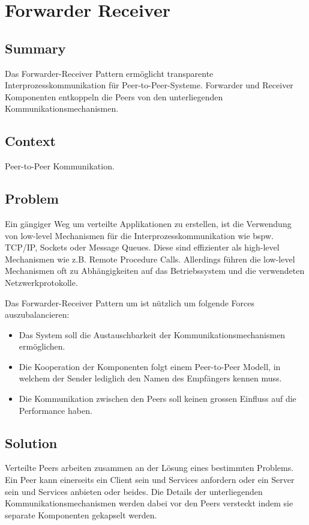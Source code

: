 \chapter{Forwarder Receiver}
\section{Summary}
Das Forwarder-Receiver Pattern ermöglicht transparente Interprozesskommunikation für Peer-to-Peer-Systeme. Forwarder und Receiver Komponenten entkoppeln die Peers von den unterliegenden Kommunikationsmechanismen.

\section{Context}
Peer-to-Peer Kommunikation.

\section{Problem}
Ein gängiger Weg um verteilte Applikationen zu erstellen, ist die Verwendung von low-level Mechanismen für die Interprozesskommunikation wie bspw. TCP/IP, Sockets oder Message Queues. Diese sind effizienter als high-level Mechanismen wie z.B. Remote Procedure Calls. Allerdings führen die low-level Mechanismen oft zu Abhängigkeiten auf das Betriebssystem und die verwendeten Netzwerkprotokolle.

Das Forwarder-Receiver Pattern um ist nützlich um folgende Forces auszubalancieren:
\begin{itemize}
	\item Das System soll die Austauschbarkeit der Kommunikationsmechanismen ermöglichen.
	\item Die Kooperation der Komponenten folgt einem Peer-to-Peer Modell, in welchem der Sender lediglich den Namen des Empfängers kennen muss.
	\item Die Kommunikation zwischen den Peers soll keinen grossen Einfluss auf die Performance haben.
\end{itemize}

\section{Solution}
Verteilte Peers arbeiten zusammen an der Lösung eines bestimmten Problems. Ein Peer kann einerseits ein Client sein und Services anfordern oder ein Server sein und Services anbieten oder beides. Die Details der unterliegenden Kommunikationsmechanismen werden dabei vor den Peers versteckt indem sie separate Komponenten gekapselt werden.

